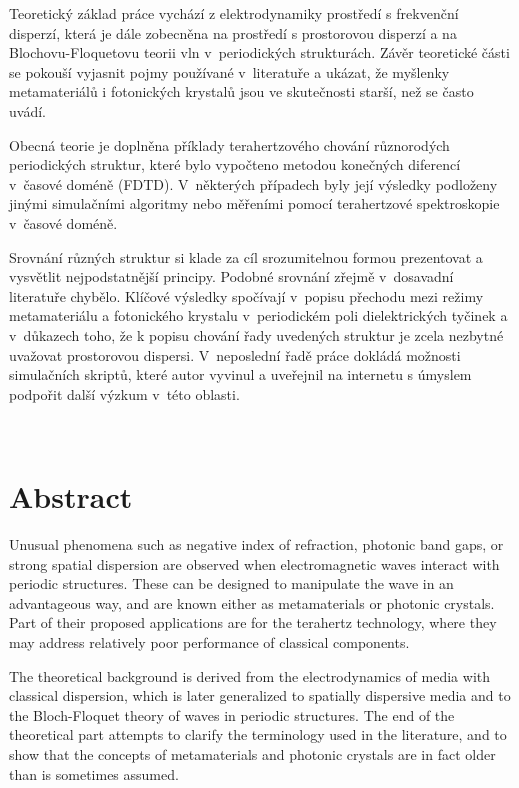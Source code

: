 Teoretický základ práce vychází z elektrodynamiky prostředí s frek\-ven\-ční dis\-per\-zí, která je dále zobecněna na prostředí s prostorovou disperzí a na Blochovu-Floquetovu teorii vln v~periodických strukturách. Závěr teoretické části se pokouší vyjasnit pojmy používané v~literatuře a ukázat, že myšlenky metamateriálů i foto\-nic\-kých krystalů jsou ve skutečnosti starší, než se často uvádí.

Obecná teorie je doplněna příklady terahertzového chování různorodých periodických struktur, které bylo vypočteno metodou konečných diferencí v~časové doméně (FDTD). V~některých případech byly její výsledky podloženy jinými simulačními algoritmy nebo měřeními pomocí terahertzové spektroskopie v~časové doméně.

Srovnání  různých struktur si klade za cíl srozumitelnou formou prezentovat a vy\-svět\-lit nej\-pod\-stat\-něj\-ší principy. Podobné srov\-nání zřejmě v~dosavadní literatuře chy\-bě\-lo. Klíčové vý\-sledky spočí\-vají v~popisu přechodu mezi režimy metamateriálu a fotonického krystalu v~periodickém poli dielektrických tyčinek a v~důkazech toho, že k popisu chování řady uvedených struktur je zcela nezbytné uvažovat prostorovou dispersi. V~neposlední řadě práce dokládá možnosti simulačních skriptů, které autor vyvinul a uveřejnil na internetu s úmyslem podpořit další výzkum v~této oblasti. 

\vspace{0mm}

\thispagestyle{empty} \newpage ~ \thispagestyle{empty} \newpage \setcounter{page}{1}

{\let\clearpage\relax\chapter*{Abstract}}
\noindent
Unusual phenomena such as negative index of refraction, photonic band gaps, or strong spatial dispersion are observed when electromagnetic waves interact with periodic structures. These can be designed to manipulate the wave in an advantageous way, and are known either as metamaterials or photonic crystals. Part of their proposed applications are for the terahertz technology, where they may address relatively poor performance of classical components.

The theoretical background is derived from the electrodynamics of media with classical dispersion, which is later generalized to spatially dispersive media and to the Bloch-Floquet theory of waves in periodic structures. The end of the theoretical part attempts to clarify the terminology used in the literature, and to show that the concepts of metamaterials and photonic crystals are in fact older than is sometimes assumed.

